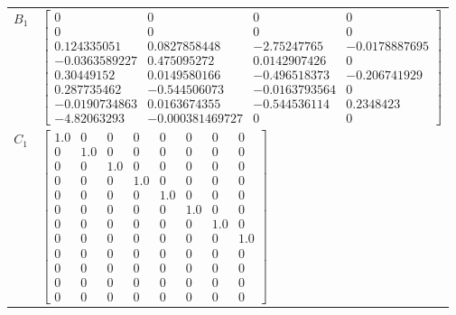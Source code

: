 \begin{tabular}{cl}
 $B_{1}$  & $\left[\begin{matrix}0 & 0 & 0 & 0\\0 & 0 & 0 & 0\\0.124335051 & 0.0827858448 & -2.75247765 & -0.0178887695\\-0.0363589227 & 0.475095272 & 0.0142907426 & 0\\0.30449152 & 0.0149580166 & -0.496518373 & -0.206741929\\0.287735462 & -0.544506073 & -0.0163793564 & 0\\-0.0190734863 & 0.0163674355 & -0.544536114 & 0.2348423\\-4.82063293 & -0.000381469727 & 0 & 0\end{matrix}\right]$                                                                                                                                                                                                                                                                                                                                                                                  \\
 $C_{1}$  & $\left[\begin{matrix}1.0 & 0 & 0 & 0 & 0 & 0 & 0 & 0\\0 & 1.0 & 0 & 0 & 0 & 0 & 0 & 0\\0 & 0 & 1.0 & 0 & 0 & 0 & 0 & 0\\0 & 0 & 0 & 1.0 & 0 & 0 & 0 & 0\\0 & 0 & 0 & 0 & 1.0 & 0 & 0 & 0\\0 & 0 & 0 & 0 & 0 & 1.0 & 0 & 0\\0 & 0 & 0 & 0 & 0 & 0 & 1.0 & 0\\0 & 0 & 0 & 0 & 0 & 0 & 0 & 1.0\\0 & 0 & 0 & 0 & 0 & 0 & 0 & 0\\0 & 0 & 0 & 0 & 0 & 0 & 0 & 0\\0 & 0 & 0 & 0 & 0 & 0 & 0 & 0\\0 & 0 & 0 & 0 & 0 & 0 & 0 & 0\end{matrix}\right]$                                                                                                                                                                                                                                                                                                                               \\

\end{tabular}
